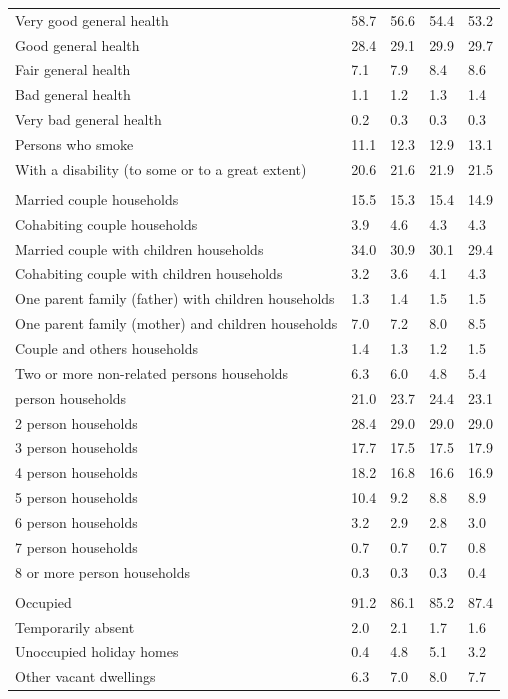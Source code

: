 \documentclass{article}
\begin{document}
\begin{table}[h]
\begin{tabular}{KTTTT}
    \hline
Very good general health & 58.7& 56.6&54.4& 53.2\\
Good general health & 28.4& 29.1& 29.9& 29.7\\
Fair general health & 7.1& 7.9&8.4& 8.6\\
Bad general health & 1.1& 1.2&1.3& 1.4\\
Very bad general health & 0.2& 0.3&0.3& 0.3\\
    \hline
Persons who smoke & 11.1& 12.3&12.9& 13.1\\
    \hline
With a disability (to some or to a great extent) & 20.6& 21.6&21.9& 21.5\\
\hline
    \\ 
    \hline
Married couple households & 15.5& 15.3& 15.4& 14.9\\
Cohabiting couple households & 3.9& 4.6& 4.3& 4.3\\
Married couple with children households & 34.0& 30.9& 30.1& 29.4\\
Cohabiting couple with children households & 3.2& 3.6& 4.1& 4.3\\
One parent family (father) with  children households & 1.3& 1.4& 1.5& 1.5\\
One parent family (mother) and children households & 7.0& 7.2& 8.0& 8.5\\
Couple and others households  & 1.4& 1.3& 1.2& 1.5\\
Two or more non-related persons households & 6.3& 6.0& 4.8& 5.4\\
     person households & 21.0& 23.7& 24.4& 23.1\\
2 person households & 28.4& 29.0& 29.0& 29.0\\
3 person households & 17.7& 17.5& 17.5& 17.9\\
4 person households & 18.2& 16.8& 16.6& 16.9\\
5 person households & 10.4&  9.2&  8.8&  8.9\\
6 person households & 3.2& 2.9& 2.8& 3.0\\
7 person households & 0.7& 0.7& 0.7& 0.8\\
8 or more person households & 0.3& 0.3& 0.3& 0.4\\
\hline
    \\ 
    \hline
Occupied & 91.2& 86.1& 85.2& 87.4\\
Temporarily absent & 2.0& 2.1& 1.7& 1.6\\
Unoccupied holiday homes & 0.4& 4.8& 5.1& 3.2\\
Other vacant dwellings & 6.3& 7.0& 8.0& 7.7\\
\hline
\end{tabular}
\end{table}
\end{document}
